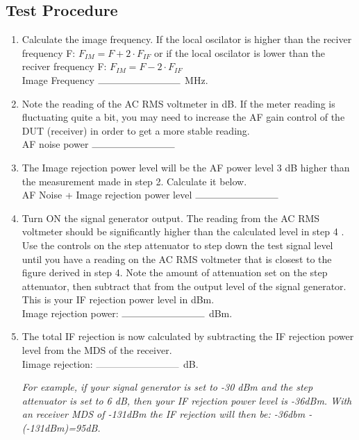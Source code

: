 \documentclass[10pt,letterpaper]{book}
\begin{document}
\subsection*{Test Procedure}
\begin{enumerate}
	\item Calculate the image frequency. If the local oscilator is higher than the reciver frequency F: $  F_{IM} = F + 2 \cdot F_{IF}$ or if the local oscilator is lower than the reciver frequency F: $  F_{IM} = F - 2 \cdot F_{IF}$
	\vspace{30pt}
	\\Image Frequency $\rule{3cm}{0.1mm}$ MHz.

	\item Note the reading of the AC RMS voltmeter in dB. If the meter reading is fluctuating quite a bit, you may need to increase the AF gain control of the DUT (receiver) in order to get a more stable reading.
	\vspace{30pt}
	\\AF noise power $\rule{3cm}{0.1mm}$ 

	\item  The Image rejection power level will be the AF power level 3 dB higher than the measurement made in step 2. Calculate it below.
	\vspace{30pt}
	\\AF Noise + Image rejection power level $\rule{3cm}{0.1mm}$ 

	\item Turn ON the signal generator output. The reading from the AC RMS voltmeter should be significantly higher than the calculated level in step 4 . Use the controls on the step attenuator to step down the test signal level until you have a reading on the AC RMS voltmeter that is closest to the figure derived in step 4. Note the amount of attenuation set on the step attenuator, then subtract that from the output level of the signal generator. This is your IF rejection power level in dBm.
	\vspace{30pt}
	\\Image rejection power: $\rule{3cm}{0.1mm}$ dBm.
	 
	\item  The total IF rejection is now calculated by subtracting the IF rejection power level from the MDS of the receiver.
	\vspace{30pt}
	 \\Iimage rejection: $\rule{3cm}{0.1mm}$ dB.

	\emph{For example, if your signal generator is set to -30 dBm and the step attenuator is set to 6 dB, then your IF rejection power level is -36dBm. With an receiver MDS of -131dBm the IF rejection will then be: -36dbm -(-131dBm)=95dB.} 
\end{enumerate}
\end{document}
